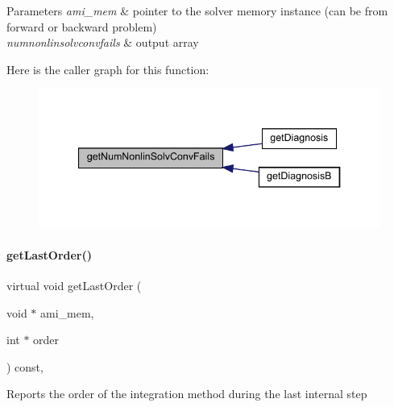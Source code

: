 \begin{DoxyParams}{Parameters}
{\em ami\+\_\+mem} & pointer to the solver memory instance (can be from forward or backward problem) \\
\hline
{\em numnonlinsolvconvfails} & output array \\
\hline
\end{DoxyParams}
Here is the caller graph for this function\+:
\nopagebreak
\begin{figure}[H]
\begin{center}
\leavevmode
\includegraphics[width=340pt]{classamici_1_1_solver_a34f79927b47e70db74f77943936e18b0_icgraph}
\end{center}
\end{figure}
\mbox{\label{classamici_1_1_solver_a491a5e0ffd6c1678a8bb5313df88ab45}} 
\paragraph{\texorpdfstring{get\+Last\+Order()}{getLastOrder()}}
{\footnotesize\ttfamily virtual void get\+Last\+Order (\begin{DoxyParamCaption}\item[{void $\ast$}]{ami\+\_\+mem,  }\item[{int $\ast$}]{order }\end{DoxyParamCaption}) const\hspace{0.3cm}{\ttfamily [protected]}, {}}

Reports the order of the integration method during the last internal step


